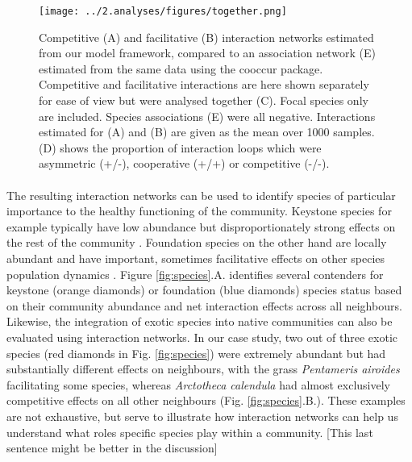 \documentclass[a4,12pt]{article}
\begin{document}
    \begin{figure}[H]
        \hspace*{-2cm}
        \texttt{[image: ../2.analyses/figures/together.png]}
        \caption{Competitive (A) and facilitative (B) interaction networks estimated from our model framework, compared to an association network (E) estimated from the same data using the cooccur package. Competitive and facilitative interactions are here shown separately for ease of view but were analysed together (C). Focal species only are included. Species associations (E) were all negative.  Interactions estimated for (A) and (B) are given as the mean over 1000 samples. (D) shows the proportion of interaction loops which were asymmetric (+/-), cooperative (+/+) or competitive (-/-).}
        \label{fig:netwks}
    \end{figure}    

    \paragraph{} 
    The resulting interaction networks can be used to identify species of particular importance to the healthy functioning of the community. Keystone species for example typically have low abundance but disproportionately strong effects on the rest of the community \citep{Power1996}. Foundation species on the other hand are locally abundant and have important, sometimes facilitative effects on other species population dynamics \citep{Ellison2019}. Figure \ref{fig:species}.A. identifies several contenders for keystone (orange diamonds) or foundation (blue diamonds) species status based on their community abundance and net interaction effects across all neighbours. Likewise, the integration of exotic species into native communities can also be evaluated using interaction networks. In our case study, two out of three exotic species (red diamonds in Fig. \ref{fig:species}) were extremely abundant but had substantially different effects on neighbours, with the grass \textit{Pentameris airoides} facilitating some species, whereas \textit{Arctotheca calendula} had almost exclusively competitive effects on all other neighbours (Fig. \ref{fig:species}.B.). These examples are not exhaustive, but serve to illustrate how interaction networks can help us understand what roles specific species play within a community.  [This last sentence might be better in the discussion]


\end{document}
